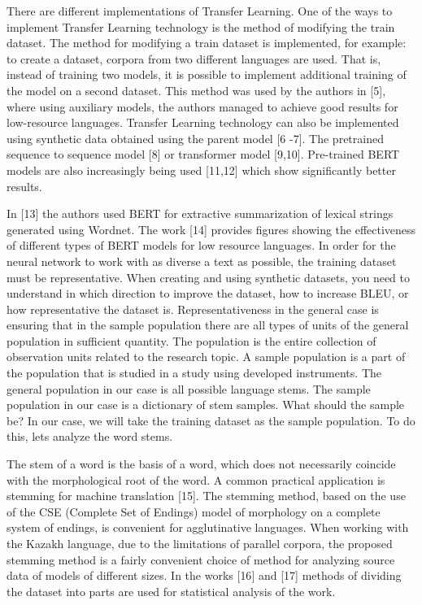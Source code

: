 There are different implementations of Transfer Learning. One of the
ways to implement Transfer Learning technology is the method of
modifying the train dataset. The method for modifying a train dataset is
implemented, for example: to create a dataset, corpora from two
different languages \hspace{0pt}\hspace{0pt}are used. That is, instead
of training two models, it is possible to implement additional training
of the model on a second dataset. This method was used by the authors in
{[}5{]}, where using auxiliary models, the authors managed to achieve
good results for low-resource languages. Transfer Learning technology
can also be implemented using synthetic data obtained using the parent
model {[}6 -7{]}. The pretrained sequence to sequence model {[}8{]} or
transformer model {[}9,10{]}. Pre-trained BERT models are also
increasingly being used {[}11,12{]} which show significantly better
results.

In {[}13{]} the authors used BERT for extractive summarization of
lexical strings generated using Wordnet. The work {[}14{]} provides
figures showing the effectiveness of different types of BERT models for
low resource languages. In order for the neural network to work with as
diverse a text as possible, the training dataset must be representative.
When creating and using synthetic datasets, you need to understand in
which direction to improve the dataset, how to increase BLEU, or how
representative the dataset is. Representativeness in the general case is
ensuring that in the sample population there are all types of units of
the general population in sufficient quantity. The population is the
entire collection of observation units related to the research topic. A
sample population is a part of the population that is studied in a study
using developed instruments. The general population in our case is all
possible language stems. The sample population in our case is a
dictionary of stem samples. What should the sample be? In our case, we
will take the training dataset as the sample population. To do this,
let\textquotesingle s analyze the word stems.

The stem of a word is the basis of a word, which does not necessarily
coincide with the morphological root of the word. A common practical
application is stemming for machine translation {[}15{]}. The stemming
method, based on the use of the CSE (Complete Set of Endings) model of
morphology on a complete system of endings, is convenient for
agglutinative languages. When working with the Kazakh language, due to
the limitations of parallel corpora, the proposed stemming method is a
fairly convenient choice of method for analyzing source data of models
of different sizes. In the works {[}16{]} and {[}17{]} methods of
dividing the dataset into parts are used for statistical analysis of the
work.

